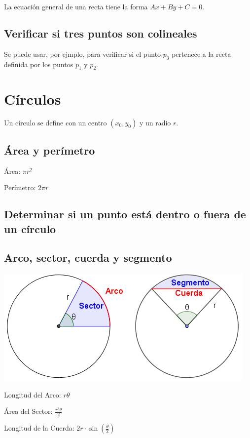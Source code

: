 \documentclass{article}
\begin{document}
\begin{multicols}{2}
La ecuación general de una recta tiene la forma \( Ax+By+C=0 \).


\subsection{Verificar si tres puntos son colineales}
Se puede usar, por ejmplo, para verificar si el punto \( p_3 \) pertenece a la recta definida por los puntos \( p_1 \) y \( p_2 \).



\section{Círculos}
Un círculo se define con un centro \( (x_0, y_0) \) y un radio \( r \).

\subsection{Área y perímetro}
Área: \( \pi r^2 \)

Perímetro:  \( 2 \pi r \)

\subsection{Determinar si un punto está dentro o fuera de un círculo}


\subsection{Arco, sector, cuerda y segmento}
\includegraphics[width=0.8\columnwidth]{circulos}

Longitud del Arco: \( r \theta \)

Área del Sector: \( \frac{r^2 \theta}{2} \)

Longitud de la Cuerda: \( 2 r \cdot \sin (\frac{\theta}{2} ) \)


\end{multicols}
\end{document}
